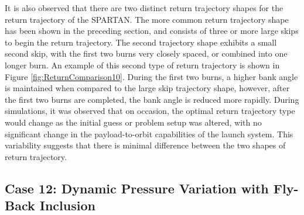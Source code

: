 It is also observed that there are two distinct return trajectory shapes for the return trajectory of the SPARTAN. The more common return trajectory shape has been shown in the preceding section, and consists of three or more large skips to begin the return trajectory. The second trajectory shape exhibits a small second skip, with the first two burns very closely spaced, or combined into one longer burn. An example of this second type of return trajectory is shown in Figure \ref{fig:ReturnComparison10}. During the first two burns, a higher bank angle is maintained when compared to the large skip trajectory shape, however, after the first two burns are completed, the bank angle is reduced more rapidly. 
During simulations, it was observed that on occasion, the optimal return trajectory type would change as the initial guess or problem setup was altered, with no significant change in the payload-to-orbit capabilities of the launch system. This variability suggests that there is minimal difference between the two shapes of return trajectory. 





\subsection{Case 12: Dynamic Pressure Variation with Fly-Back Inclusion}


